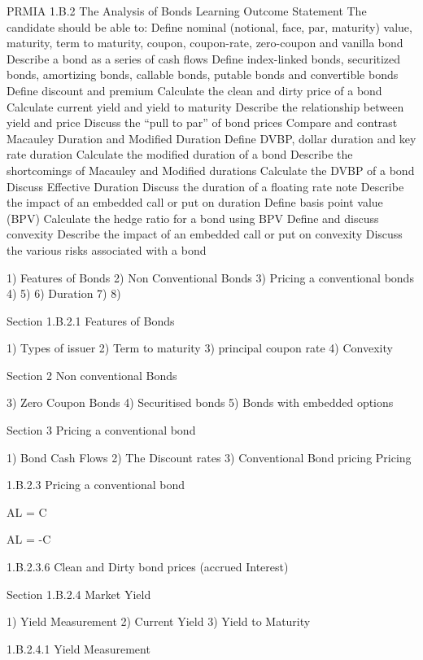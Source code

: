 PRMIA 1.B.2 The Analysis of Bonds
Learning Outcome Statement
The candidate should be able to:
 Define nominal (notional, face, par, maturity) value, maturity, term to maturity, coupon, coupon-rate, zero-coupon and vanilla bond
 Describe a bond as a series of cash flows
 Define index-linked bonds, securitized bonds, amortizing bonds, callable bonds, putable bonds and convertible bonds
 Define discount and premium
 Calculate the clean and dirty price of a bond
 Calculate current yield and yield to maturity
 Describe the relationship between yield and price
 Discuss the “pull to par” of bond prices
 Compare and contrast Macauley Duration and Modified Duration
 Define DVBP, dollar duration and key rate duration
 Calculate the modified duration of a bond
 Describe the shortcomings of Macauley and Modified durations
 Calculate the DVBP of a bond
 Discuss Effective Duration
 Discuss the duration of a floating rate note
 Describe the impact of an embedded call or put on duration
 Define basis point value (BPV)
 Calculate the hedge ratio for a bond using BPV
 Define and discuss convexity
 Describe the impact of an embedded call or put on convexity
 Discuss the various risks associated with a bond

1) Features of Bonds
2) Non Conventional Bonds
3) Pricing a conventional bonds
4)
5) 
6) Duration
7) 
8) 

Section 1.B.2.1 Features of Bonds

1) Types of issuer
2) Term to maturity
3) principal coupon rate
4) Convexity

Section 2 Non conventional Bonds

3) Zero Coupon Bonds
4) Securitised bonds
5) Bonds with embedded options

Section 3 Pricing a conventional bond

1) Bond Cash Flows
2) The Discount rates
3) Conventional Bond pricing
Pricing 


1.B.2.3 Pricing a conventional bond

AL = C 

AL = -C 


1.B.2.3.6 Clean and Dirty bond prices (accrued Interest)

Section 1.B.2.4 Market Yield

1) Yield Measurement
2) Current Yield
3) Yield to Maturity



1.B.2.4.1 Yield Measurement

